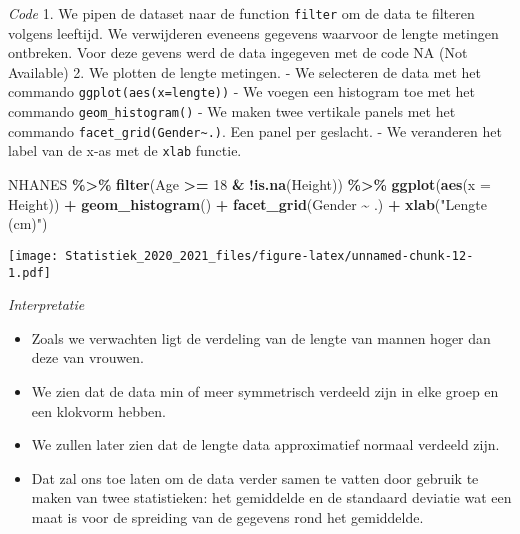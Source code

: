 \documentclass[
  12pt,dutch,coursenotes]{book}
\newenvironment{Shaded}{\begin{snugshade}}{\end{snugshade}}
\newcommand{\DataTypeTok}[1]{\textcolor[rgb]{0.13,0.29,0.53}{#1}}
\newcommand{\DecValTok}[1]{\textcolor[rgb]{0.00,0.00,0.81}{#1}}
\newcommand{\KeywordTok}[1]{\textcolor[rgb]{0.13,0.29,0.53}{\textbf{#1}}}
\newcommand{\NormalTok}[1]{#1}
\newcommand{\OperatorTok}[1]{\textcolor[rgb]{0.81,0.36,0.00}{\textbf{#1}}}
\newcommand{\StringTok}[1]{\textcolor[rgb]{0.31,0.60,0.02}{#1}}
\providecommand{\tightlist}{%
  \setlength{\itemsep}{0pt}\setlength{\parskip}{0pt}}
\theoremstyle{definition}
\theoremstyle{definition}
\theoremstyle{definition}
\theoremstyle{remark}
\begin{document}
\emph{Code}
1. We pipen de dataset naar de function \texttt{filter} om de data te filteren volgens leeftijd. We verwijderen eveneens gegevens waarvoor de lengte metingen ontbreken. Voor deze gevens werd de data ingegeven met de code NA (Not Available)
2. We plotten de lengte metingen.
- We selecteren de data met het commando \texttt{ggplot(aes(x=lengte))}
- We voegen een histogram toe met het commando \texttt{geom\_histogram()}
- We maken twee vertikale panels met het commando \texttt{facet\_grid(Gender\textasciitilde{}.)}. Een panel per geslacht.
- We veranderen het label van de x-as met de \texttt{xlab} functie.

\begin{Shaded}
\begin{Highlighting}[]
\NormalTok{NHANES }\OperatorTok{\%\textgreater{}\%}\StringTok{ }\KeywordTok{filter}\NormalTok{(Age }\OperatorTok{\textgreater{}=}\StringTok{ }\DecValTok{18} \OperatorTok{\&}\StringTok{ }\OperatorTok{!}\KeywordTok{is.na}\NormalTok{(Height)) }\OperatorTok{\%\textgreater{}\%}\StringTok{ }\KeywordTok{ggplot}\NormalTok{(}\KeywordTok{aes}\NormalTok{(}\DataTypeTok{x =}\NormalTok{ Height)) }\OperatorTok{+}\StringTok{ }
\StringTok{    }\KeywordTok{geom\_histogram}\NormalTok{() }\OperatorTok{+}\StringTok{ }\KeywordTok{facet\_grid}\NormalTok{(Gender }\OperatorTok{\textasciitilde{}}\StringTok{ }\NormalTok{.) }\OperatorTok{+}\StringTok{ }\KeywordTok{xlab}\NormalTok{(}\StringTok{"Lengte (cm)"}\NormalTok{)}
\end{Highlighting}
\end{Shaded}

\texttt{[image: Statistiek\_2020\_2021\_files/figure-latex/unnamed-chunk-12-1.pdf]}

\emph{Interpretatie}

\begin{itemize}
\tightlist
\item
  Zoals we verwachten ligt de verdeling van de lengte van mannen hoger dan deze van vrouwen.
\item
  We zien dat de data min of meer symmetrisch verdeeld zijn in elke groep en een klokvorm hebben.
\item
  We zullen later zien dat de lengte data approximatief normaal verdeeld zijn.
\item
  Dat zal ons toe laten om de data verder samen te vatten door gebruik te maken van twee statistieken: het gemiddelde en de standaard deviatie wat een maat is voor de spreiding van de gegevens rond het gemiddelde.
\end{itemize}
\end{document}

